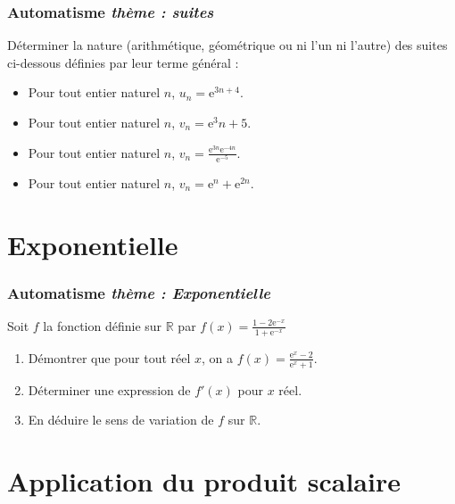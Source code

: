 \documentclass[11pt]{beamer}
\newcommand{\R}{\mathbb{R}}
\newcounter{autocompteur}
\newcommand{\automatisme}[1]{\addtocounter{autocompteur}{1}\frametitle{Automatisme  \theautocompteur  \textit{ thème : #1}}}
\begin{document}
\begin{frame}
\automatisme{suites}

Déterminer la nature (arithmétique, géométrique ou ni l'un ni l'autre) des suites ci-dessous définies par leur terme général :

\begin{itemize}
\item Pour tout entier naturel $n$,  $u_{n}=\text{e}^{3n+4}$.
\item Pour tout entier naturel $n$,  $v_{n}=\text{e}^{3}n+5$.
\item Pour tout entier naturel $n$,  $v_{n}=\frac{\text{e}^{3n}\text{e}^{-4n}}{\text{e}^{-5}}$.
\item Pour tout entier naturel $n$,  $v_{n}=\text{e}^{n}+ \text{e}^{2n}$.
\end{itemize}
\end{frame}




\section{Exponentielle}

\begin{frame}
\automatisme{Exponentielle}
Soit $f$ la fonction définie sur $\R$ par $f(x)=\frac{1 - 2\text{e}^{-x}}{1+\text{e}^{-x}}$
\begin{enumerate}
\item Démontrer que pour tout réel $x$, on a $f(x) = \frac{\text{e}^{x}-2}{\text{e}^{x}+1}$.
\item Déterminer une expression de $f'(x)$ pour $x$ réel.
\item En déduire le sens de variation de $f$ sur $\R$.

\end{enumerate}



\end{frame}


\section{Application du produit scalaire}

\label{prodscalaire}
\end{document}
